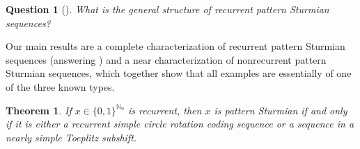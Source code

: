 \documentclass[11pt,reqno]{amsart}
\newtheorem{question}[theorem]{Question}
\theoremstyle{definition}
\theoremstyle{plain}
\newcounter{MainTheoremCounter}
\newtheorem{Maintheorem}[MainTheoremCounter]{Theorem}
\newcommand{\N}{\mathbb{N}}
\newcommand{\AuthornoteA}[2]{{\sf\small\color{magenta}{[#1: #2]}}}
\newcommand{\AuthornoteR}[2]{{\sf\small\color{blue}{[#1: #2]}}}
\newcommand{\Anote}{\AuthornoteA{A}}
\newcommand{\rp}{\AuthornoteR{R}}
\begin{document}
\begin{question}[{\cite[Problem 1]{Kamae-Zamboni-sequence_entropy}}]\label{ques:Kamae-Zamboni}
What is the general structure of recurrent pattern Sturmian sequences?
\end{question}


Our main results are a complete characterization of recurrent pattern Sturmian sequences (answering ) and a near characterization of nonrecurrent pattern Sturmian sequences, which together show that all examples are essentially of one of the three known types. %

\begin{Maintheorem}\label{mainthm:sturmian}
If $x \in \{0,1\}^{\N_0}$ is recurrent, then $x$ is pattern Sturmian if and only if it is either a recurrent simple circle rotation coding sequence or a sequence in a nearly simple Toeplitz subshift.
\end{Maintheorem}


\end{document}
